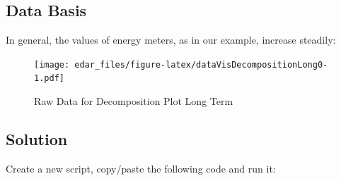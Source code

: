 \documentclass[
]{book}
\begin{document}
\hypertarget{data-basis-4}{%
\subsection{Data Basis}\label{data-basis-4}}

In general, the values of energy meters, as in our example, increase steadily:

\begin{figure}
\centering
\texttt{[image: edar\_files/figure-latex/dataVisDecompositionLong0-1.pdf]}
\caption{\label{fig:dataVisDecompositionLong0}Raw Data for Decomposition Plot Long Term}
\end{figure}

\hypertarget{solution-4}{%
\subsection{Solution}\label{solution-4}}

Create a new script, copy/paste the following code and run it:
\end{document}
